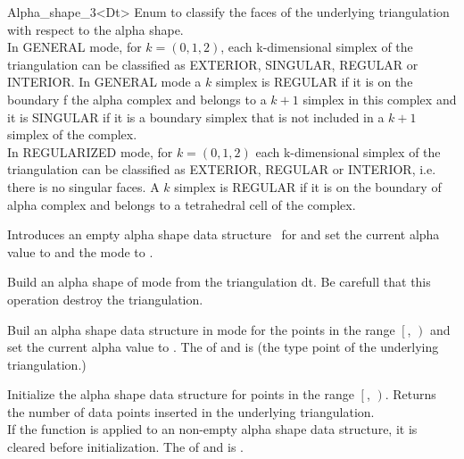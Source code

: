 \begin{ccRefClass} {Alpha_shape_3<Dt>}
{Enum to classify the faces of the underlying 
triangulation with respect to the alpha shape. \\ 
In GENERAL mode, for $k=(0,1,2)$,
 each k-dimensional simplex of the triangulation
can be classified as EXTERIOR, SINGULAR, REGULAR
or INTERIOR.
In GENERAL mode a $k$ simplex is REGULAR if it is on the boundary
f the alpha complex and belongs to a $k+1$ simplex in this complex
and it is SINGULAR  if it is  a boundary simplex that is not included in a $k+1$ simplex of the complex. \\  
In REGULARIZED mode, for $k=(0,1,2)$
each k-dimensional simplex of the triangulation
can be classified as EXTERIOR, REGULAR or INTERIOR, i.e.
there is no singular faces.
A $k$ simplex is REGULAR if it is on the boundary of alpha complex
and belongs to a tetrahedral cell of the complex.}




\ccCreation
{}

{Introduces an empty alpha shape data structure
\ccVar\ for and set the
current alpha value to  and the mode to .}

{Build an alpha shape of mode  
from the triangulation dt. 
Be carefull that this operation destroy the triangulation.}

{Buil an alpha shape data structure in mode  
for the points in the range
$\left[\right.$, $\left.\right)$ and 
set the current alpha value to .
\ccPrecond The  of  and
 is  (the type point of the underlying 
triangulation.)}


\ccModifiers

{Initialize the alpha shape data structure
for  points in the range
$\left[\right.$, $\left.\right)$. 
Returns the number of data points inserted in the underlying
triangulation. \\ 
If the function is applied to an non-empty alpha shape data structure, it is cleared
before initialization.
\ccPrecond The  of  and
 is .}


\end{ccRefClass}
